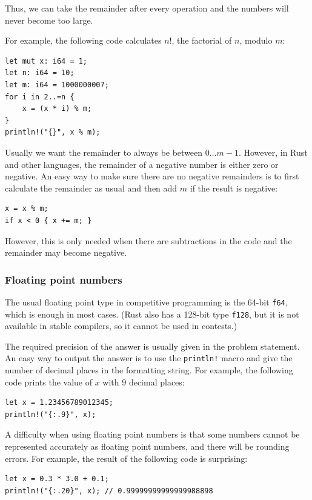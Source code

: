 Thus, we can take the remainder after every operation
and the numbers will never become too large.

For example, the following code calculates $n!$,
the factorial of $n$, modulo $m$:
\begin{lstlisting}
let mut x: i64 = 1;
let n: i64 = 10;
let m: i64 = 1000000007;
for i in 2..=n {
    x = (x * i) % m;
}
println!("{}", x % m);
\end{lstlisting}

Usually we want the remainder to always
be between $0\ldots m-1$.
However, in Rust and other languages,
the remainder of a negative number
is either zero or negative.
An easy way to make sure there
are no negative remainders is to first calculate
the remainder as usual and then add $m$
if the result is negative:
\begin{lstlisting}
x = x % m;
if x < 0 { x += m; }
\end{lstlisting}
However, this is only needed when there
are subtractions in the code and the
remainder may become negative.

\subsubsection{Floating point numbers}


The usual floating point type in
competitive programming is
the 64-bit \texttt{f64}, which is enough in most cases.
(Rust also has a 128-bit type \texttt{f128},
but it is not available in stable compilers,
so it cannot be used in contests.)

The required precision of the answer
is usually given in the problem statement.
An easy way to output the answer is to use
the \texttt{println!} macro
and give the number of decimal places
in the formatting string.
For example, the following code prints
the value of $x$ with 9 decimal places:

\begin{lstlisting}
let x = 1.23456789012345;
println!("{:.9}", x);
\end{lstlisting}

A difficulty when using floating point numbers
is that some numbers cannot be represented
accurately as floating point numbers,
and there will be rounding errors.
For example, the result of the following code
is surprising:

\begin{lstlisting}
let x = 0.3 * 3.0 + 0.1;
println!("{:.20}", x); // 0.99999999999999988898
\end{lstlisting}

